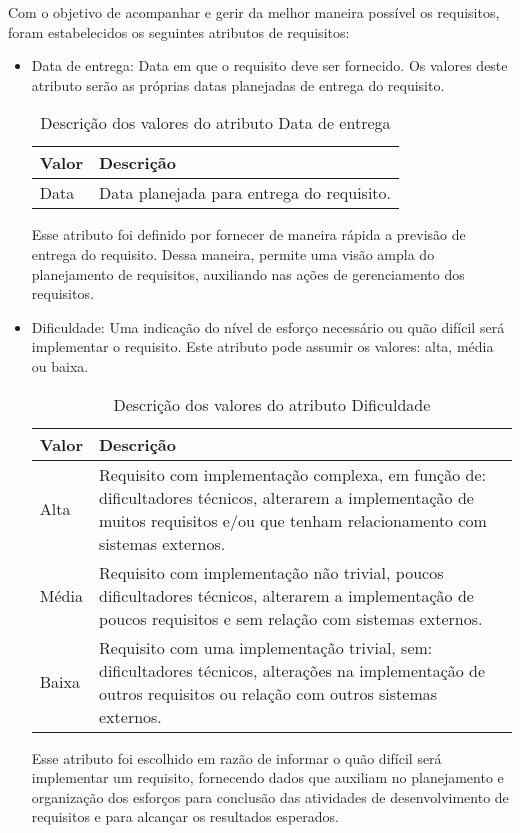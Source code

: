 Com o objetivo de acompanhar e gerir da melhor maneira possível os requisitos, foram estabelecidos os seguintes atributos de requisitos:
\begin{itemize}
\item Data de entrega:
Data em que o requisito deve ser fornecido. Os valores deste atributo serão as próprias datas planejadas de entrega do requisito.

\begin{table}[h]
\centering
\caption{Descrição dos valores do atributo Data de entrega}
\label{Rotulo}
\begin{tabular}{|l|l|}
\hline
\textbf{Valor} & \textbf{Descrição} \\
\hline
Data & Data planejada para entrega do requisito. \\ \hline
\end{tabular}
\end{table}

Esse atributo foi definido por fornecer de maneira rápida a previsão de entrega do requisito. Dessa maneira, permite uma visão ampla do planejamento de requisitos, auxiliando nas ações de gerenciamento dos requisitos.
\item Dificuldade:
Uma indicação do nível de esforço necessário ou quão difícil será implementar o requisito. Este atributo pode assumir os valores: alta, média ou baixa.

\begin{table}[h]
\centering
\caption{Descrição dos valores do atributo Dificuldade}
\label{Rotulo}
\begin{tabular}{ | l | p{1\linewidth} | }
\hline
\textbf{Valor} & \textbf{Descrição} \\ \hline
Alta  &  Requisito com implementação complexa, em função de: dificultadores técnicos, alterarem a implementação de muitos requisitos e/ou que tenham relacionamento com sistemas externos. \\ \hline
Média & Requisito com implementação não trivial, poucos dificultadores técnicos, alterarem a implementação de poucos requisitos e sem relação com sistemas externos. \\ \hline
Baixa & Requisito com uma implementação trivial, sem: dificultadores técnicos, alterações na implementação de outros requisitos ou relação com outros sistemas externos. \\ \hline
\end{tabular}
\end{table}

Esse atributo foi escolhido em razão de informar o quão difícil será implementar um requisito, fornecendo dados que auxiliam no planejamento e organização dos esforços para conclusão das atividades de desenvolvimento de requisitos e para alcançar os resultados esperados.


\end{itemize}
